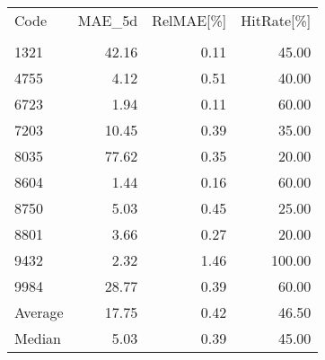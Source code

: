 \begingroup
\footnotesize
\begin{tabular}{lrrr}
\hline
Code & MAE\_5d & RelMAE[\%] & HitRate[\%] \\\\
\hline
1321 & 42.16 & 0.11 & 45.00 \\
4755 & 4.12 & 0.51 & 40.00 \\
6723 & 1.94 & 0.11 & 60.00 \\
7203 & 10.45 & 0.39 & 35.00 \\
8035 & 77.62 & 0.35 & 20.00 \\
8604 & 1.44 & 0.16 & 60.00 \\
8750 & 5.03 & 0.45 & 25.00 \\
8801 & 3.66 & 0.27 & 20.00 \\
9432 & 2.32 & 1.46 & 100.00 \\
9984 & 28.77 & 0.39 & 60.00 \\
Average & 17.75 & 0.42 & 46.50 \\
Median & 5.03 & 0.39 & 45.00 \\
\hline
\end{tabular}
\endgroup
